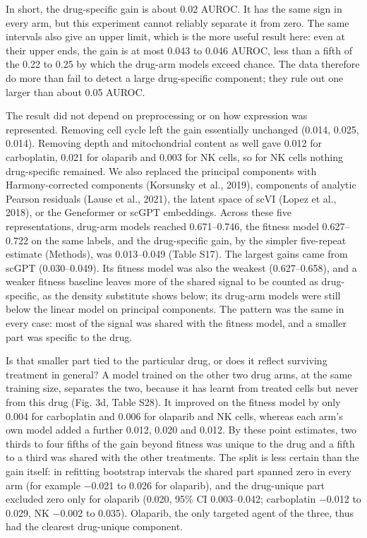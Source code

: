 \documentclass[11pt,a4paper]{article}
\begin{document}
In short, the drug-specific gain is about 0.02 AUROC. It has the same sign in every arm, but this experiment cannot reliably separate it from zero. The same intervals also give an upper limit, which is the more useful result here: even at their upper ends, the gain is at most 0.043 to 0.046 AUROC, less than a fifth of the 0.22 to 0.25 by which the drug-arm models exceed chance. The data therefore do more than fail to detect a large drug-specific component; they rule out one larger than about 0.05 AUROC.

The result did not depend on preprocessing or on how expression was represented. Removing cell cycle left the gain essentially unchanged (0.014, 0.025, 0.014). Removing depth and mitochondrial content as well gave 0.012 for carboplatin, 0.021 for olaparib and 0.003 for NK cells, so for NK cells nothing drug-specific remained. We also replaced the principal components with Harmony-corrected components (Korsunsky et al., 2019), components of analytic Pearson residuals (Lause et al., 2021), the latent space of scVI (Lopez et al., 2018), or the Geneformer or scGPT embeddings. Across these five representations, drug-arm models reached 0.671--0.746, the fitness model 0.627--0.722 on the same labels, and the drug-specific gain, by the simpler five-repeat estimate (Methods), was 0.013--0.049 (Table S17). The largest gains came from scGPT (0.030--0.049). Its fitness model was also the weakest (0.627--0.658), and a weaker fitness baseline leaves more of the shared signal to be counted as drug-specific, as the density substitute shows below; its drug-arm models were still below the linear model on principal components. The pattern was the same in every case: most of the signal was shared with the fitness model, and a smaller part was specific to the drug.

Is that smaller part tied to the particular drug, or does it reflect surviving treatment in general? A model trained on the other two drug arms, at the same training size, separates the two, because it has learnt from treated cells but never from this drug (Fig. 3d, Table S28). It improved on the fitness model by only 0.004 for carboplatin and 0.006 for olaparib and NK cells, whereas each arm's own model added a further 0.012, 0.020 and 0.012. By these point estimates, two thirds to four fifths of the gain beyond fitness was unique to the drug and a fifth to a third was shared with the other treatments. The split is less certain than the gain itself: in refitting bootstrap intervals the shared part spanned zero in every arm (for example $-$0.021 to 0.026 for olaparib), and the drug-unique part excluded zero only for olaparib (0.020, 95\% CI 0.003--0.042; carboplatin $-$0.012 to 0.029, NK $-$0.002 to 0.035). Olaparib, the only targeted agent of the three, thus had the clearest drug-unique component.
\end{document}
